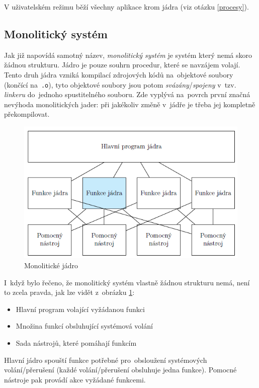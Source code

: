 V uživatelském režimu běží všechny aplikace krom jádra (viz otázku \ref{procesy}).

\subsection{Monolitický systém}

Jak již napovídá samotný název, \emph{monolitický systém} je systém který nemá skoro žádnou strukturu. Jádro je pouze souhrn procedur, které se navzájem volají. Tento druh jádra vzniká kompilací zdrojových kódů na~objektové soubory (končící na~\texttt{.o}), tyto objektové soubory jsou potom \emph{svázány}/\emph{spojeny} v~tzv. \emph{linkeru} do~jednoho spustitelného souboru. Zde vyplývá na~povrch první značná nevýhoda monolitických jader: při jakékoliv změně v~jádře je třeba jej kompletně překompilovat.

\begin{figure}[ht]
    \centering
    \includegraphics[scale=1]{images/OS_mono_kernel.png}
    \caption{Monolitické jádro}
    \label{OS_mono_kernel}
\end{figure}

I~když bylo řečeno, že monolitický systém vlastně žádnou strukturu nemá, není to zcela pravda, jak lze vidět z~obrázku \ref{OS_mono_kernel}:

\begin{itemize}[noitemsep]
    \item Hlavní program volající vyžádanou funkci
    \item Množina funkcí obsluhující systémová volání
    \item Sada nástrojů, které pomáhají funkcím
\end{itemize}

Hlavní jádro spouští funkce potřebné pro~obsloužení systémových volání/přerušení (každé volání/přerušení obsluhuje jedna funkce). Pomocné nástroje pak provádí akce vyžádané funkcemi. 

